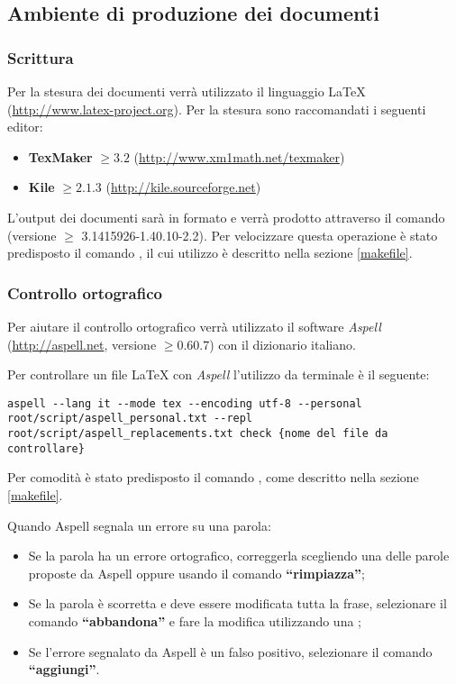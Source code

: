 	\subsection{Ambiente di produzione dei documenti}
	
		\subsubsection{Scrittura}
		
		Per la stesura dei documenti verrà utilizzato il linguaggio \LaTeX{} (\url{http://www.latex-project.org}).
		Per la stesura sono raccomandati i seguenti editor:
		\begin{itemize}
		 \item \textbf{TexMaker} $\geq 3.2$ (\url{http://www.xm1math.net/texmaker})
		 \item \textbf{Kile} $\geq 2.1.3$ (\url{http://kile.sourceforge.net})
		\end{itemize}
		
		L'output dei documenti sarà in formato  e verrà prodotto attraverso il comando  (versione $\geq$ 3.1415926-1.40.10-2.2). Per velocizzare questa operazione è stato predisposto il comando , il cui utilizzo è descritto nella sezione \ref{makefile}.
		
		\subsubsection{Controllo ortografico}
		
		Per aiutare il controllo ortografico verrà utilizzato il software \emph{Aspell} (\url{http://aspell.net}, versione $\geq 0.60.7$) con il dizionario italiano.
		
		Per controllare un file \LaTeX{} con \emph{Aspell} l'utilizzo da terminale è il seguente:
\begin{lstlisting}
aspell --lang it --mode tex --encoding utf-8 --personal root/script/aspell_personal.txt --repl root/script/aspell_replacements.txt check {nome del file da controllare}
\end{lstlisting}
		
		Per comodità è stato predisposto il comando , come descritto nella sezione \ref{makefile}.
		
		Quando Aspell segnala un errore su una parola:
		\begin{itemize}
		 \item Se la parola ha un errore ortografico, correggerla scegliendo una delle parole proposte da Aspell oppure usando il comando \textbf{``rimpiazza''};
		 \item Se la parola è scorretta e deve essere modificata tutta la frase, selezionare il comando \textbf{``abbandona''} e fare la modifica utilizzando una ;
		 \item Se l'errore segnalato da Aspell è un falso positivo, selezionare il comando \textbf{``aggiungi''}.
		\end{itemize}

